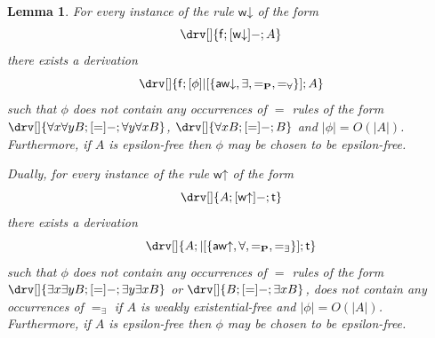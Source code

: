 \documentclass[10pt]{article}
\newtheorem{lemma}[theorem]{Lemma}
\theoremstyle{definition}\newtheorem{remark}[theorem]{Remark}
\theoremstyle{definition}\newtheorem{example}[theorem]{Example}
\theoremstyle{definition}\newtheorem{definition}[theorem]{Definition}
\newcommand{\awUp}{{\mathsf{aw\mathord\uparrow}}}
\newcommand{\awDown}{{\mathsf{aw\mathord\downarrow}}}
\newcommand{\wUp}{{\mathsf{w\mathord\uparrow}}}
\newcommand{\wDown}{{\mathsf{w\mathord\downarrow}}}
\newcommand{\eqProp}{=_{\textbf{P}}}
\newcommand{\eqExists}{=_{\exists}}
\newcommand{\eqForall}{=_{\forall}}
\newcommand{\trueUnit}{\mathsf{t}}
\newcommand{\falseUnit}{\mathsf{f}}
\begin{document}
	\begin{lemma}\label{WeakeningDecomposition}
		For every instance of the rule $\wDown$ of the form
		\[
		\drv[] {
			\falseUnit ; [\wDown]- ; A
		}
		\]
		there exists a derivation
		\[
		\drv[] {
			\falseUnit ; [\phi]|[\{\awDown, \exists, \eqProp, \eqForall\}] ; A
		}
		\]
		such that $\phi$ does not contain any occurrences of $=$ rules of the form $\drv[] {\forall x \forall y B ; [=]- ; \forall y \forall x B}$, $\drv[] {\forall x B ; [=]- ; B}$ and $| \phi | = O(|A|)$. Furthermore, if $A$ is epsilon-free then $\phi$ may be chosen to be epsilon-free.
		
		Dually, for every instance of the rule $\wUp$ of the form
		\[
		\drv[] {
			A ; [\wUp]- ; \trueUnit
		}
		\]
		there exists a derivation
		\[
		\drv[] {
			A ; |[\{\awUp, \forall, \eqProp, \eqExists\}] ; \trueUnit
		}
		\]
		such that $\phi$ does not contain any occurrences of $=$ rules of the form $\drv[] {\exists x \exists y B ; [=]- ; \exists y \exists x B}$ or $\drv[] {B ; [=]- ; \exists x B}$, does not contain any occurrences of $\eqExists$ if $A$ is weakly existential-free and $| \phi | = O(|A|)$. Furthermore, if $A$ is epsilon-free then $\phi$ may be chosen to be epsilon-free.
	\end{lemma}
	
\end{document}
